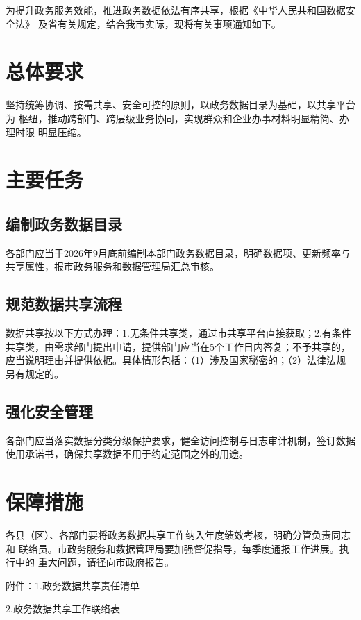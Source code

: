 \documentclass[linespread=1.81, twoside]{ctexart}
\begin{document}
为提升政务服务效能，推进政务数据依法有序共享，根据《中华人民共和国数据安全法》
及省有关规定，结合我市实际，现将有关事项通知如下。

\section{总体要求}

坚持统筹协调、按需共享、安全可控的原则，以政务数据目录为基础，以共享平台为
枢纽，推动跨部门、跨层级业务协同，实现群众和企业办事材料明显精简、办理时限
明显压缩。

\section{主要任务}

\subsection{编制政务数据目录}

各部门应当于2026年9月底前编制本部门政务数据目录，明确数据项、更新频率与
共享属性，报市政务服务和数据管理局汇总审核。

\subsection{规范数据共享流程}

数据共享按以下方式办理：1.无条件共享类，通过市共享平台直接获取；2.有条件
共享类，由需求部门提出申请，提供部门应当在5个工作日内答复；不予共享的，
应当说明理由并提供依据。具体情形包括：（1）涉及国家秘密的；（2）法律法规
另有规定的。

\subsection{强化安全管理}

各部门应当落实数据分类分级保护要求，健全访问控制与日志审计机制，签订数据
使用承诺书，确保共享数据不用于约定范围之外的用途。

\section{保障措施}

各县（区）、各部门要将政务数据共享工作纳入年度绩效考核，明确分管负责同志和
联络员。市政务服务和数据管理局要加强督促指导，每季度通报工作进展。执行中的
重大问题，请径向市政府报告。

\par\nointerlineskip
\vspace{\baselineskip}
\noindent\hspace{2\ccwd}附件：1.政务数据共享责任清单\par
\noindent\hspace{2\ccwd}\hphantom{附件：}2.政务数据共享工作联络表\par
\end{document}
